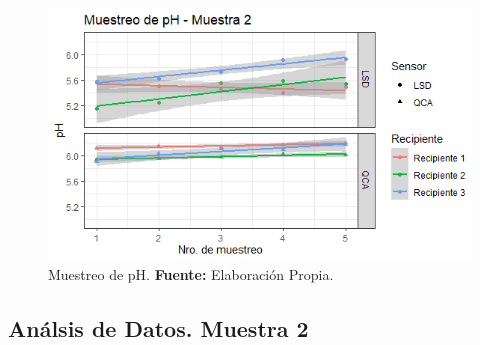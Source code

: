     \begin{figure}[H]
        \centering
        \includegraphics[width=0.75\linewidth]{Imagenes/cap4/pH_M2.png}
        \caption {Muestreo de pH. \textbf{Fuente:}
        Elaboraci\'on Propia. }
        \label{fig:M2PH}
    \end{figure}

\subsection{An\'alsis de Datos. Muestra 2}

